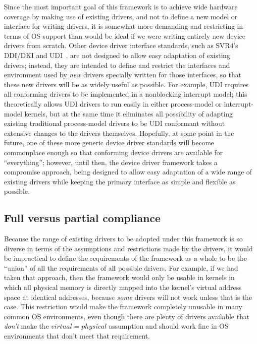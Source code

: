 Since the most important goal of this framework
is to achieve wide hardware coverage by making use of existing drivers,
and not to define a new model or interface for writing drivers,
it is somewhat more demanding and restricting in terms of OS support
than would be ideal if we were writing entirely new device drivers
from scratch.
Other device driver interface standards,
such as SVR4's DDI/DKI and UDI~\cite{udi:url},
are not designed to allow easy adaptation of existing drivers;
instead, they are intended to define and restrict
the interfaces and environment used by \emph{new} drivers
specially written for those interfaces,
so that these new drivers will be as widely useful as possible.
For example, UDI requires all conforming drivers
to be implemented in a nonblocking interrupt model;
this theoretically allows UDI drivers to run easily
in either process-model or interrupt-model kernels,
but at the same time it eliminates all possibility
of adapting existing traditional process-model drivers to be UDI conformant
without extensive changes to the drivers themselves.
Hopefully, at some point in the future,
one of these more generic device driver standards
will become commonplace enough
so that conforming device drivers are available for ``everything'';
however, until then, the \oskit{} device driver framework
takes a compromise approach,
being designed to allow easy adaptation of a wide range of existing drivers
while keeping the primary interface as simple and flexible as possible.

\subsection{Full versus partial compliance}

Because the range of existing drivers to be adopted under this framework
is so diverse in terms of the assumptions and restrictions made by the drivers,
it would be impractical
to define the requirements of the framework as a whole
to be the ``union'' of all the requirements of all possible drivers.
For example, if we had taken that approach,
then the framework would only be usable in kernels
in which all physical memory is directly mapped
into the kernel's virtual address space at identical addresses,
because \emph{some} drivers will not work unless that is the case.
This restriction would make the framework completely unusable
in many common OS environments,
even though there are plenty of drivers available
that \emph{don't} make the $virtual=physical$ assumption
and should work fine in OS environments that don't meet that requirement.

